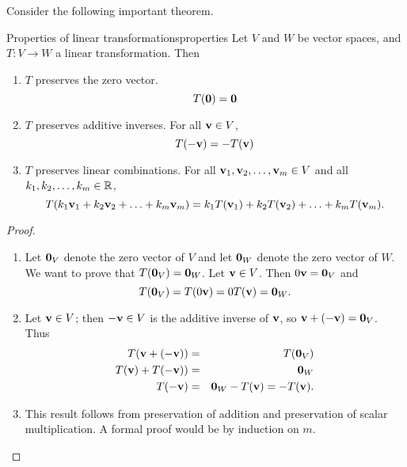 Consider the following important theorem.

\begin{theorem}{Properties of linear transformations}{properties}
  Let $V$ and $W$ be vector spaces, and $T:V \to W$ a linear
  transformation.  Then
  \begin{enumerate}
  \item $T$ preserves the zero vector.
    \begin{equation*}
      T(\mbox{\bf 0})=\mbox{\bf 0}
    \end{equation*}
  \item $T$ preserves additive inverses.
    For all $\mbox{\bf v}\in V$,
    \begin{equation*}
      T(-\mbox{\bf v})= -T(\mbox{\bf v})
    \end{equation*}
  \item $T$ preserves linear combinations.
    For all $\mbox{\bf v}_1, \mbox{\bf v}_2, \ldots, \mbox{\bf v}_m \in V$ and
    all $k_1, k_2, \ldots, k_m\in\mathbb{R}$,
    \begin{equation*}
      T(k_1\mbox{\bf v}_1 + k_2\mbox{\bf v}_2 + \ldots + k_m\mbox{\bf v}_m)
      = k_1T(\mbox{\bf v}_1) + k_2T(\mbox{\bf v}_2) + \ldots + k_mT(\mbox{\bf v}_m).
    \end{equation*}
  \end{enumerate}
\end{theorem}

\begin{proof}
  \begin{enumerate}
  \item Let $\mbox{\bf 0}_V$ denote the zero vector of $V$ and let
    $\mbox{\bf 0}_W$ denote the zero vector of $W$.  We want to prove that
    $T(\mbox{\bf 0}_V)=\mbox{\bf 0}_W$.  Let $\mbox{\bf v}\in V$.  Then
    $0\mbox{\bf v}=\mbox{\bf 0}_V$ and
    \begin{equation*}
      T(\mbox{\bf 0}_V)=T(0\mbox{\bf v})=0T(\mbox{\bf v})=\mbox{\bf 0}_W.
    \end{equation*}
  \item Let $\mbox{\bf v}\in V$; then $-\mbox{\bf v}\in V$ is the additive
    inverse of $\mbox{\bf v}$, so $\mbox{\bf v} + (-\mbox{\bf v})=\mbox{\bf 0}_V$.
    Thus
    \begin{eqnarray*}
      T(\mbox{\bf v} + (-\mbox{\bf v})) & = & T(\mbox{\bf 0}_V) \\
      T(\mbox{\bf v}) + T(-\mbox{\bf v})) & = & \mbox{\bf 0}_W \\
      T(-\mbox{\bf v}) & = & \mbox{\bf 0}_W - T(\mbox{\bf v}) =  - T(\mbox{\bf v}).
    \end{eqnarray*}
  \item This result follows from preservation of addition and
    preservation of scalar multiplication.  A formal proof would be by
    induction on $m$.
  \end{enumerate}
\end{proof}

